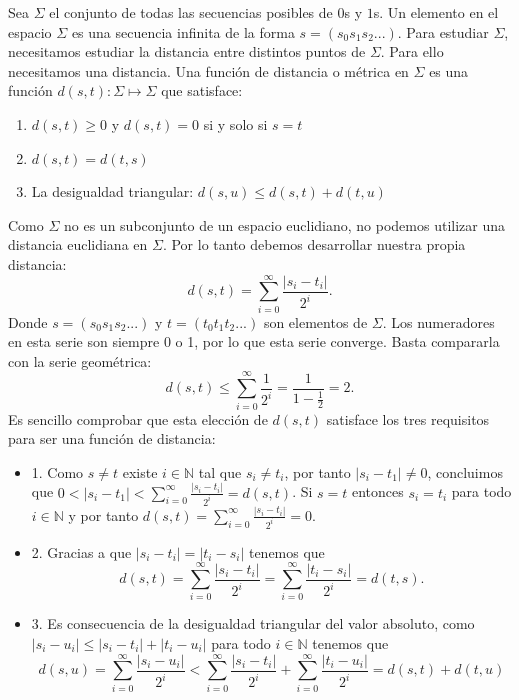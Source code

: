 \documentclass[12pt,a4paper]{report}
\theoremstyle{definition}
\begin{document}
Sea \(\Sigma\) el conjunto de todas las secuencias posibles de $0$s y $1$s. Un elemento en el espacio \(\Sigma\) es una secuencia infinita de la forma \(s=(s_{0}s_{1}s_{2}...)\). Para estudiar \(\Sigma\), necesitamos estudiar la distancia entre distintos puntos de \(\Sigma\). Para ello necesitamos una distancia. Una función de distancia o métrica en \(\Sigma\) es una función \(d(s,t) : \Sigma \mapsto \Sigma\) que satisface:
\begin{enumerate}
    \item  \(d(s,t)\ge0\) y \(d(s,t)=0\) si y solo si \(s=t\)
    \item  \(d(s,t)=d(t,s)\)
    \item  La desigualdad triangular: \(d(s,u)\le d(s,t)+d(t,u)\)
\end{enumerate}
%
Como \(\Sigma\) no es un subconjunto de un espacio euclidiano, no podemos utilizar una distancia euclidiana en \(\Sigma\). Por lo tanto debemos desarrollar nuestra propia distancia:
\[
d(s,t)=\sum_{i=0}^{\infty}\frac{|s_{i}-t_{i}|}{2^{i}}.
\]
%
Donde \(s=(s_{0}s_{1}s_{2}...)\) y \(t=(t_{0}t_{1}t_{2}...)\) son elementos de \(\Sigma\). Los numeradores en esta serie son siempre 0 o 1, por lo que esta serie converge. Basta compararla con la serie geométrica:
\[
d(s,t)\le\sum_{i=0}^{\infty}\frac{1}{2^{i}}=\frac{1}{1-\frac{1}{2}}=2.
\]
%
Es sencillo comprobar que esta elección de \(d(s,t)\) satisface los tres requisitos para ser una función de distancia:
\begin{itemize}
    \item 1. Como $s \neq t$ existe $i \in \mathbb{N}$ tal que $s_i \neq t_i$, por tanto $|s_i - t_1| \neq 0$, concluimos que $ 0 < |s_i - t_1| < \sum_{i=0}^{\infty}\frac{|s_{i}-t_{i}|}{2^{i}} = d(s,t)$. Si $s = t$ entonces $s_i = t_i$ para todo $i \in \mathbb{N}$ y por tanto $d(s,t) = \sum_{i=0}^{\infty}\frac{|s_{i}-t_{i}|}{2^{i}} = 0$.
    \item 2. Gracias a que $|s_i - t_i| = |t_i - s_i|$ tenemos que \[d(s,t) = \sum_{i=0}^{\infty}\frac{|s_{i}-t_{i}|}{2^{i}} = \sum_{i=0}^{\infty}\frac{|t_{i}-s_{i}|}{2^{i}} = d(t,s).\]
    \item 3. Es consecuencia de la desigualdad triangular del valor absoluto, como $|s_i - u_i| \leq |s_i - t_i| + |t_i - u_i|$ para todo  $i \in \mathbb{N}$ tenemos que 
    $$d(s,u) = \sum_{i=0}^{\infty}\frac{|s_{i}-u_{i}|}{2^{i}} < \sum_{i=0}^{\infty}\frac{|s_{i}-t_{i}|}{2^{i}} + \sum_{i=0}^{\infty}\frac{|t_{i}-u_{i}|}{2^{i}} = d(s,t) + d(t,u)$$
    
\end{itemize}
\end{document}
